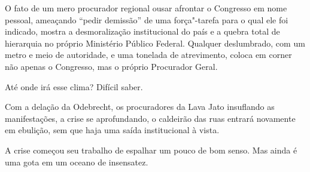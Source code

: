 O fato de um mero procurador regional ousar afrontar o Congresso em nome
pessoal, ameaçando ``pedir demissão'' de uma força"-tarefa para o qual
ele foi indicado, mostra a desmoralização institucional do país e a
quebra total de hierarquia no próprio Ministério Público Federal.
Qualquer deslumbrado, com um metro e meio de autoridade, e uma tonelada
de atrevimento, coloca em corner não apenas o Congresso, mas o próprio
Procurador Geral.

Até onde irá esse clima? Difícil saber.

Com a delação da Odebrecht, os procuradores da Lava Jato insuflando as
manifestações, a crise se aprofundando, o caldeirão das ruas entrará
novamente em ebulição, sem que haja uma saída institucional à vista.

A crise começou seu trabalho de espalhar um pouco de bom senso. Mas
ainda é uma gota em um oceano de insensatez.
